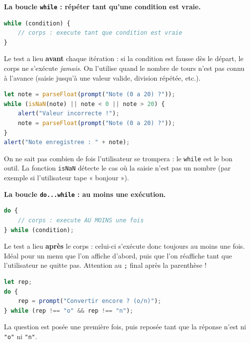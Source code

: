 \documentclass[11pt]{article}
\begin{document}
\textbf{La boucle \texttt{while} : répéter tant qu'une condition est vraie.}

\begin{propriete}
\begin{lstlisting}[language=JavaScript]
while (condition) {
    // corps : execute tant que condition est vraie
}
\end{lstlisting}
Le test a lieu \textbf{avant} chaque itération : si la condition est fausse dès le départ, le corps ne s'exécute \emph{jamais}. On l'utilise quand le nombre de tours n'est pas connu à l'avance (saisie jusqu'à une valeur valide, division répétée, etc.).
\end{propriete}

\begin{exemplebox}
\begin{lstlisting}[language=JavaScript]
let note = parseFloat(prompt("Note (0 a 20) ?"));
while (isNaN(note) || note < 0 || note > 20) {
    alert("Valeur incorrecte !");
    note = parseFloat(prompt("Note (0 a 20) ?"));
}
alert("Note enregistree : " + note);
\end{lstlisting}
On ne sait pas combien de fois l'utilisateur se trompera : le \texttt{while} est le bon outil. La fonction \texttt{isNaN} détecte le cas où la saisie n'est pas un nombre (par exemple si l'utilisateur tape « bonjour »).
\end{exemplebox}

\textbf{La boucle \texttt{do...while} : au moins une exécution.}

\begin{propriete}
\begin{lstlisting}[language=JavaScript]
do {
    // corps : execute AU MOINS une fois
} while (condition);
\end{lstlisting}
Le test a lieu \textbf{après} le corps : celui-ci s'exécute donc toujours au moins une fois. Idéal pour un menu que l'on affiche d'abord, puis que l'on réaffiche tant que l'utilisateur ne quitte pas. Attention au \texttt{;} final après la parenthèse !
\end{propriete}

\begin{exemplebox}
\begin{lstlisting}[language=JavaScript]
let rep;
do {
    rep = prompt("Convertir encore ? (o/n)");
} while (rep !== "o" && rep !== "n");
\end{lstlisting}
La question est posée une première fois, puis reposée tant que la réponse n'est ni \texttt{"o"} ni \texttt{"n"}.
\end{exemplebox}
\end{document}
